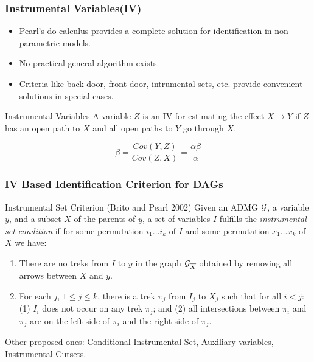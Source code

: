 \documentclass{beamer}
\begin{document}
\begin{frame}
	\frametitle{Instrumental Variables(IV)}
	\begin{itemize}
		\item Pearl's do-calculus provides a complete solution for identification in non-parametric models.
		\item No practical general algorithm exists.
		\item Criteria like back-door, front-door, intrumental sets, etc. provide convenient solutions in special cases.
	\end{itemize}

	\begin{block}{Instrumental Variables}
		A variable $ Z $ is an IV for estimating the effect $ X \rightarrow Y $
		if $ Z $ has an open path to $ X $ and all open paths to $ Y $ go through
		$ X $.
	\end{block}
	\begin{figure}
		\centering
		\begin{subfigure}{0.5\linewidth}
		\end{subfigure}%
		\begin{subfigure}{0.5\linewidth}
			$$ \beta = \frac{Cov(Y, Z)}{Cov(Z, X)} = \frac{\alpha \beta}{\alpha}$$
		\end{subfigure}
	\end{figure}
\end{frame}

\begin{frame}
	\frametitle{IV Based Identification Criterion for DAGs}
	\begin{block}{Instrumental Set Criterion (Brito and Pearl 2002)}
		Given an ADMG $\cal G$, a variable $y$, and a subset $X$ of the
		parents of $y$,  a set of variables $I$ fulfills the
		\emph{instrumental set condition} if for {some} permutation $
		i_1 \ldots i_k $ of $ I $ and {some} permutation $ x_1 \ldots
		x_k $ of $ X $ we have: 
	\begin{enumerate}
		\item There are no treks from $I$ to $y$ in the graph ${\cal
			G}_{\overline{X}}$ obtained by removing all arrows
			between $X$ and $y$. 
		\item For each $j$, $1 \leq j \leq k$, there is a trek $\pi_j$ from
			$I_j$ to $X_j$ such that for all $i < j$: (1) $I_i$ does not
			occur on any trek $\pi_j$; and (2) all intersections between
			$\pi_i$ and $\pi_j$ are on the left side of $\pi_i$ and the
			right side of $\pi_j$.
	\end{enumerate}
	\end{block}
	Other proposed ones: Conditional Instrumental Set, Auxiliary variables, Instrumental Cutsets.
\end{frame}
\end{document}
